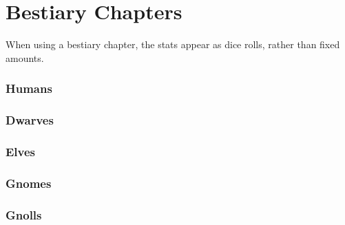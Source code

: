 \documentclass[a4paper,openany]{book}
\begin{document}
\setcounter{Air}{2}
\setcounter{Combat}{0}
\setcounter{Projectiles}{0}

\setcounter{fp}{5}

\renewcommand\characterWeapon{\shortsword}
\renewcommand\characterArmour{}
\renewcommand\characterEquipment{Bag of flour, bag of chalk, dagger, unopened letter}
\setcounter{gold}{0}


\renewcommand\csComments{}
\clearpage


\chapter{Bestiary Chapters}

\begin{multicols}{2}


When using a bestiary chapter, the stats appear as dice rolls, rather than fixed amounts.

\subsection{Humans}

\humanfarmer

\humansoldier

\royalguard

\humandiplomat

\humanbard

\humanthief

\humanalchemist

\humanalchemist

\necromancer

\subsection{Dwarves}

\dwarvensoldier

\dwarventrader

\dwarvenrunemaster

\subsection{Elves}

\elf

\elf

\elvenenchanter

\subsection{Gnomes}

\gnome

\gnomishillusionist

\subsection{Gnolls}

\gnollhunter

\gnollshaman

\gnollshaman

\end{multicols}
\end{document}
